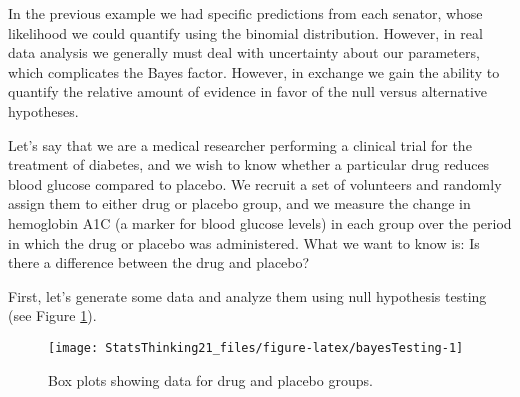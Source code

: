 \documentclass[]{book}
\newenvironment{Shaded}{\begin{snugshade}}{\end{snugshade}}
\newcommand{\KeywordTok}[1]{\textcolor[rgb]{0.13,0.29,0.53}{\textbf{#1}}}
\newcommand{\DataTypeTok}[1]{\textcolor[rgb]{0.13,0.29,0.53}{#1}}
\newcommand{\DecValTok}[1]{\textcolor[rgb]{0.00,0.00,0.81}{#1}}
\newcommand{\FloatTok}[1]{\textcolor[rgb]{0.00,0.00,0.81}{#1}}
\newcommand{\StringTok}[1]{\textcolor[rgb]{0.31,0.60,0.02}{#1}}
\newcommand{\CommentTok}[1]{\textcolor[rgb]{0.56,0.35,0.01}{\textit{#1}}}
\newcommand{\OperatorTok}[1]{\textcolor[rgb]{0.81,0.36,0.00}{\textbf{#1}}}
\newcommand{\NormalTok}[1]{#1}
\theoremstyle{definition}
\theoremstyle{definition}
\theoremstyle{definition}
\theoremstyle{remark}
\begin{document}
In the previous example we had specific predictions from each senator,
whose likelihood we could quantify using the binomial distribution.
However, in real data analysis we generally must deal with uncertainty
about our parameters, which complicates the Bayes factor. However, in
exchange we gain the ability to quantify the relative amount of evidence
in favor of the null versus alternative hypotheses.

Let's say that we are a medical researcher performing a clinical trial
for the treatment of diabetes, and we wish to know whether a particular
drug reduces blood glucose compared to placebo. We recruit a set of
volunteers and randomly assign them to either drug or placebo group, and
we measure the change in hemoglobin A1C (a marker for blood glucose
levels) in each group over the period in which the drug or placebo was
administered. What we want to know is: Is there a difference between the
drug and placebo?

First, let's generate some data and analyze them using null hypothesis
testing (see Figure \ref{fig:bayesTesting}).

\begin{Shaded}
\end{Shaded}

\begin{figure}
\texttt{[image: StatsThinking21\_files/figure-latex/bayesTesting-1]} \caption{Box plots showing data for drug and placebo groups.}\label{fig:bayesTesting}
\end{figure}
\end{document}
